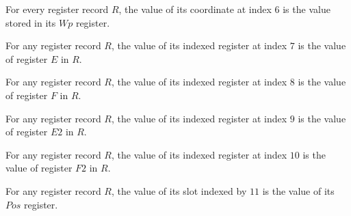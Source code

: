 \begin{lemma}
\label{Complexity.Codec.Regs.val_Wp}
\leanok
{}
For every register record $R$, the value of its coordinate at index $6$ is the value
stored in its $Wp$ register.
\end{lemma}

\begin{lemma}
\label{Complexity.Codec.Regs.val_E}
\leanok
{}
For any register record $R$, the value of its indexed register at index $7$ is the value
of register $E$ in $R$.
\end{lemma}

\begin{lemma}
\label{Complexity.Codec.Regs.val_F}
\leanok
{}
For any register record $R$, the value of its indexed register at index $8$ is the value
of register $F$ in $R$.
\end{lemma}

\begin{lemma}
\label{Complexity.Codec.Regs.val_E2}
\leanok
{}
For any register record $R$, the value of its indexed register at index $9$ is the value
of register $E2$ in $R$.
\end{lemma}

\begin{lemma}
\label{Complexity.Codec.Regs.val_F2}
\leanok
{}
For any register record $R$, the value of its indexed register at index $10$ is the
value of register $F2$ in $R$.
\end{lemma}

\begin{lemma}
\label{Complexity.Codec.Regs.val_Pos}
\leanok
{}
For any register record $R$, the value of its slot indexed by $11$ is the value of its
$Pos$ register.
\end{lemma}

